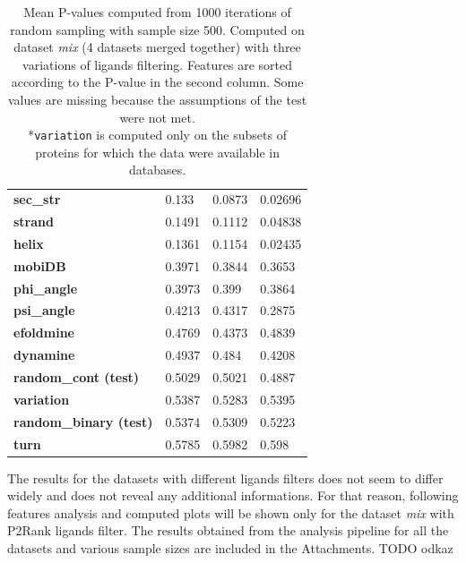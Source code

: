 \begin{table}[!htbp]
\begin{tabular}{llll}
\textbf{sec\_str}             & 0.133              & 0.0873                 & 0.02696              \\
\textbf{strand}               & 0.1491             & 0.1112                 & 0.04838              \\
\textbf{helix}                & 0.1361             & 0.1154                 & 0.02435              \\
\textbf{mobiDB}               & 0.3971             & 0.3844                 & 0.3653               \\
\textbf{phi\_angle}           & 0.3973             & 0.399                  & 0.3864               \\
\textbf{psi\_angle}           & 0.4213             & 0.4317                 & 0.2875               \\
\textbf{efoldmine}            & 0.4769             & 0.4373                 & 0.4839               \\
\textbf{dynamine}             & 0.4937             & 0.484                  & 0.4208               \\
\textbf{random\_cont (test)}         & 0.5029             & 0.5021                 & 0.4887               \\
\textbf{variation}            & 0.5387             & 0.5283                 & 0.5395               \\
\textbf{random\_binary (test)}       & 0.5374             & 0.5309                 & 0.5223               \\
\textbf{turn}                 & 0.5785             & 0.5982                 & 0.598                \\ \hline
\end{tabular}
\caption{Mean P-values computed from 1000 iterations of random sampling with sample size 500. Computed on dataset \textit{mix} (4 datasets merged together) with three variations of ligands filtering. Features are sorted according to the P-value in the second column. Some values are missing because the assumptions of the test were not met.\\\hspace{\textwidth}
*\texttt{variation} is computed only on the subsets of proteins for which the data were available in databases.}
\label{tab:pvalues500}
\end{table}

The results for the datasets with different ligands filters does not seem to differ widely and does not reveal any additional informations. For that reason, following features analysis and computed plots will be shown only for the dataset \textit{mix} with P2Rank ligands filter. The results obtained from the analysis pipeline for all the datasets and various sample sizes are included in the Attachments. TODO odkaz

